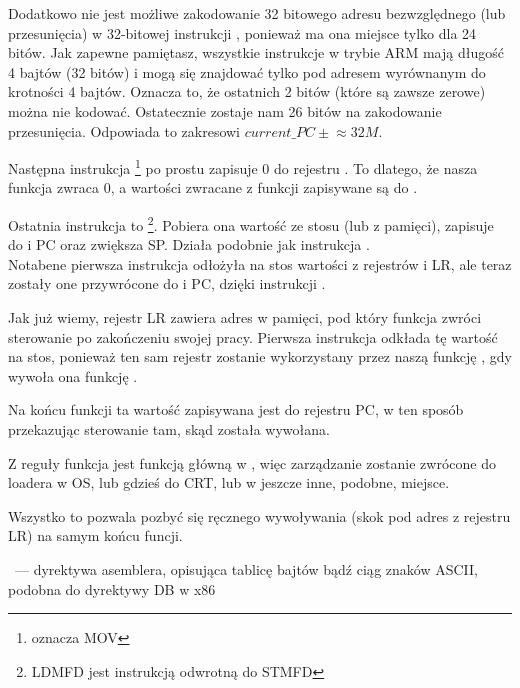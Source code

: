 Dodatkowo nie jest możliwe zakodowanie 32 bitowego adresu bezwzględnego (lub przesunięcia) w 32-bitowej instrukcji , ponieważ ma ona miejsce tylko dla 24 bitów.
Jak zapewne pamiętasz, wszystkie instrukcje w trybie ARM mają długość 4 bajtów (32 bitów) i mogą się znajdować tylko pod adresem wyrównanym do krotności 4 bajtów.
Oznacza to, że ostatnich 2 bitów (które są zawsze zerowe) można nie kodować.
Ostatecznie zostaje nam 26 bitów na zakodowanie przesunięcia. Odpowiada to zakresowi $current\_PC \pm{} \approx{}32M$.

Następna instrukcja \footnote{oznacza MOV}
po prostu zapisuje 0 do rejestru .
To dlatego, że nasza funkcja zwraca 0, a wartości zwracane z funkcji zapisywane są do .

Ostatnia instrukcja to \footnote{\ac{LDMFD} jest instrukcją odwrotną do \ac{STMFD}}.
Pobiera ona wartość ze stosu (lub z pamięci), zapisuje do  i \ac{PC} oraz zwiększa  \ac{SP}. Działa podobnie jak instrukcja \POP.\\
Notabene pierwsza instrukcja  odłożyła na stos wartości z rejestrów  i \ac{LR}, ale teraz zostały one przywrócone do  i \ac{PC}, dzięki instrukcji .

Jak już wiemy, rejestr \ac{LR} zawiera adres w pamięci, pod który funkcja zwróci sterowanie po zakończeniu swojej pracy.
Pierwsza instrukcja odkłada tę wartość na stos, ponieważ ten sam rejestr zostanie wykorzystany przez naszą funkcję \main, gdy wywoła ona funkcję \printf.

Na końcu funkcji ta wartość zapisywana jest do rejestru \ac{PC}, w ten sposób przekazując sterowanie tam, skąd została wywołana.

Z reguły funkcja \main jest funkcją główną w \CCpp, więc zarządzanie zostanie zwrócone do loadera w \ac{OS}, lub gdzieś do \ac{CRT}, lub w jeszcze inne, podobne, miejsce.

Wszystko to pozwala pozbyć się ręcznego wywoływania  (skok pod adres z rejestru \ac{LR}) na samym końcu funcji.

~--- dyrektywa asemblera, opisująca tablicę bajtów bądź ciąg znaków ASCII, podobna do dyrektywy DB w x86


